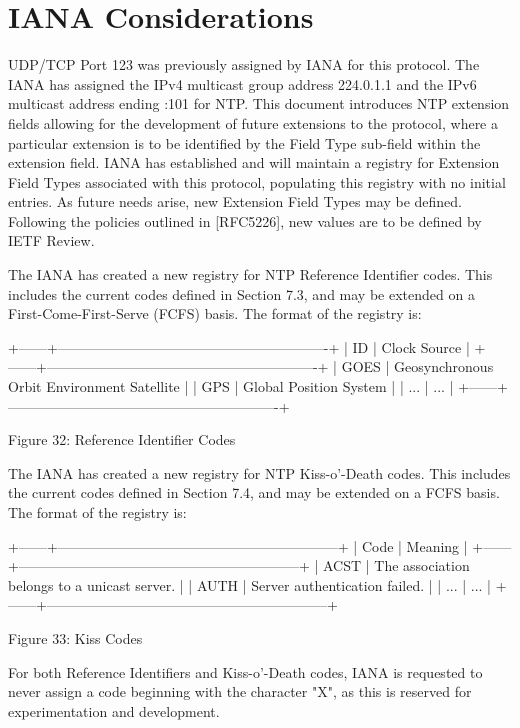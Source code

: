 \chapter{IANA Considerations}

UDP/TCP Port 123 was previously assigned by IANA for this protocol.
The IANA has assigned the IPv4 multicast group address 224.0.1.1 and
the IPv6 multicast address ending :101 for NTP.  This document
introduces NTP extension fields allowing for the development of
future extensions to the protocol, where a particular extension is to
be identified by the Field Type sub-field within the extension field.
IANA has established and will maintain a registry for Extension Field
Types associated with this protocol, populating this registry with no
initial entries.  As future needs arise, new Extension Field Types
may be defined.  Following the policies outlined in [RFC5226], new
values are to be defined by IETF Review.

The IANA has created a new registry for NTP Reference Identifier
codes.  This includes the current codes defined in Section 7.3, and
may be extended on a First-Come-First-Serve (FCFS) basis.  The format
of the registry is:

  +------+----------------------------------------------------------+
  | ID   | Clock Source                                             |
  +------+----------------------------------------------------------+
  | GOES | Geosynchronous Orbit Environment Satellite               |
  | GPS  | Global Position System                                   |
  | ...  | ...                                                      |
  +------+----------------------------------------------------------+

                Figure 32: Reference Identifier Codes

The IANA has created a new registry for NTP Kiss-o'-Death codes.
This includes the current codes defined in Section 7.4, and may be
extended on a FCFS basis.  The format of the registry is:



+------+------------------------------------------------------------+
| Code |                           Meaning                          |
+------+------------------------------------------------------------+
| ACST | The association belongs to a unicast server.               |
| AUTH | Server authentication failed.                              |
| ...  | ...                                                        |
+------+------------------------------------------------------------+

                        Figure 33: Kiss Codes

For both Reference Identifiers and Kiss-o'-Death codes, IANA is
requested to never assign a code beginning with the character "X", as
this is reserved for experimentation and development.
